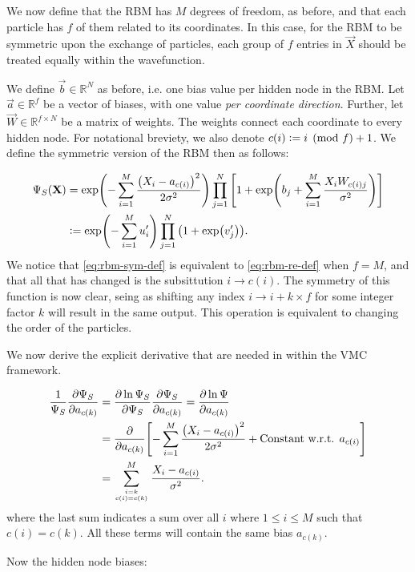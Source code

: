 \documentclass[Thesis.tex]{subfiles}
\begin{document}
We now define that the RBM has $M$ degrees of freedom, as before, and that each
particle has $f$ of them related to its coordinates. In this case, for the RBM
to be symmetric upon the exchange of particles, each group of $f$ entries in
$\vec X$ should be treated equally within the wavefunction.

We define $\vec b\in \mathbb{R}^{N}$ as before, i.e. one bias value per hidden
node in the RBM. Let $\vec a\in \mathbb{R}^{f}$ be a vector of biases, with one
value \emph{per coordinate direction}. Further, let $\vec W\in \mathbb{R}^{f
\times N}$ be a matrix of weights. The weights connect each coordinate to every
hidden node. For notational breviety, we also denote $c(i) \vcentcolon= i \pmod{f} + 1$. We
define the symmetric version of the RBM then as follows:

\begin{align}\label{eq:rbm-sym-def}
    \Psi_S(\mathbf{X}) &=\exp(-\sum_{i=1}^M \frac{\qty(X_i - a_{c(i)})^2}{2\sigma^2} )
                        \prod_{j=1}^N\qty[1 + \exp(b_j + \sum_{i=1}^M \frac{X_i
                        W_{c(i)j}}{\sigma^2})]\\
    &\vcentcolon= \exp(-\sum_{i=1}^Mu_i')\prod_{j=1}^N\qty(1 + \exp(v_j')).
\end{align}
We notice that \autoref{eq:rbm-sym-def} is equivalent to \autoref{eq:rbm-re-def}
when $f=M$, and that all that has changed is the subsittution $i\rightarrow
c(i)$. The symmetry of this function is now clear, seing as shifting any index
$i\rightarrow i + k\times f$ for some integer factor $k$ will result in the same
output. This operation is equivalent to changing the order of the particles.

We now derive the explicit derivative that are needed in within the VMC
framework.

\begin{align}
    \frac{1}{\Psi_S} \pdv{\Psi_S}{a_{c(k)}} &= \pdv{\ln
    \Psi_S}{\Psi_S}\pdv{\Psi_S}{a_{c(k)}} = \pdv{\ln \Psi}{a_{c(k)}}\\
    &= \pdv{}{a_{c(k)}}\qty[ -\sum_{i=1}^M \frac{\qty(X_i -
    a_{c(i)})^2}{2\sigma^2} + \text{Constant w.r.t. } a_{c(i)} ]\\
    &= \sum_{i=k\atop{c(i)=c(k)}}^M \frac{X_i -
    a_{c(i)}}{\sigma^2}.\label{eq:rbm-sym-deriv-a}
\end{align}
where the last sum indicates a sum over all $i$ where $1 \leq i \leq M$ such
that $c(i) = c(k)$. All these terms will contain the same bias $a_{c(k)}$.

Now the hidden node biases:
\end{document}
